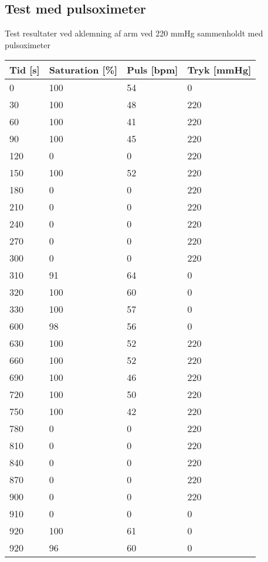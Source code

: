 \subsection{Test med pulsoximeter}

Test resultater ved aklemning af arm ved 220 mmHg sammenholdt med pulsoximeter
\begin{longtable}{p{} p{} p{} p{} }
	\hline
	Tid [s] & Saturation [\%] & Puls [bpm] & Tryk [mmHg] \\ \hline
	0 &	100 &	54 &	0 \\ \hline
	30 &	100 &	48 &	220 \\ \hline
	60 &	100 &	41 &	220 \\ \hline
	90 &	100	& 45  &	220 \\ \hline
	120	& 0	& 0	& 220 \\ \hline
	150 &	100 &	52 &	220 \\ \hline
	180	& 0 &	0 &	220 \\ \hline
	210	& 0	 & 0 &	220 \\ \hline
	240 &	0 &	0 &	220 \\ \hline
	270 &	0 &	0 &	220 \\ \hline
	300 &	0 &	0 &	220 \\ \hline
	310 &	91 &	64 &	0 \\ \hline
	320 &	100 &	60 &	0 \\ \hline
	330 &	100 &	57 &	0 \\ \hline
	600 &	98 &	56 &	0 \\ \hline
	630 &	100 &	52 &	220 \\ \hline
	660 &	100 &	52 &	220 \\ \hline
	690 &	100 &	46 &	220 \\ \hline
	720 &	100 &	50 &	220 \\ \hline
	750	 & 100 &	42 &	220 \\ \hline
	780 &	0 &	0 &	220 \\ \hline
	810 &	0 &	0 &	220 \\ \hline
	840 &	0 &	0 &	220 \\ \hline
	870 &	0 &	0 &	220 \\ \hline
	900 &	0 &	0 &	220 \\ \hline
	910 &	0 &	0 &	0 \\ \hline
	920 &	100 &	61 &	0 \\ \hline
	920 &	96 &	60 &	0 \\ \hline
\end{longtable}